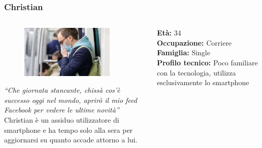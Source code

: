 \documentclass[handout]{beamer}
\begin{document}
		\begin{frame}
			\frametitle{Christian}
			\begin{columns}[t]
				\begin{column}[T]{5cm}
					\begin{figure}
						\centering
						\vspace{-10pt}
						\includegraphics[height=2.5cm]{img/christian}
					\end{figure}
					\vspace{-10pt}

					\textit{``Che giornata stancante, chissà cos'è successo oggi nel mondo, aprirò il mio feed Facebook per vedere le ultime novità''}\\
					Christian è un assiduo utilizzatore di smartphone e  ha tempo solo alla sera per aggiornarsi su quanto accade attorno a lui.
				\end{column}
				\begin{column}[T]{5cm}
					\textbf{Età:} 34\\
					\textbf{Occupazione:} Corriere\\
					\textbf{Famiglia:} Single\\
					\textbf{Profilo tecnico:} Poco familiare con la tecnologia, utilizza esclusivamente lo smartphone\\
				\end{column}
			\end{columns}
		\end{frame}
		
\end{document}
